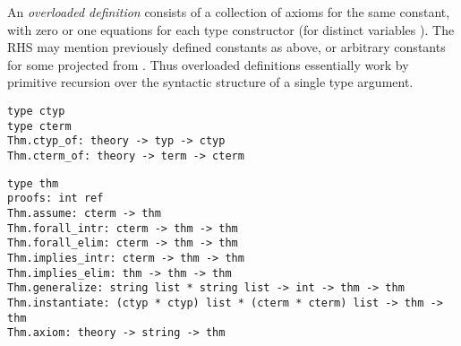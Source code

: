 \begin{isabellebody}
\begin{isamarkuptext}
  An \emph{overloaded definition} consists of a collection of axioms
  for the same constant, with zero or one equations  for each type constructor \isa{{\isasymkappa}} (for
  distinct variables \isa{\isactrlvec {\isasymalpha}}).  The RHS may mention
  previously defined constants as above, or arbitrary constants  for some  projected from \isa{\isactrlvec {\isasymalpha}}.  Thus overloaded definitions essentially work by
  primitive recursion over the syntactic structure of a single type
  argument.%
\end{isamarkuptext}%
\isamarkuptrue%
%
\isadelimmlref
%
\endisadelimmlref
%
\isatagmlref
%
\begin{isamarkuptext}%
\begin{mldecls}
  \verb|type ctyp| \\
  \verb|type cterm| \\
  \verb|Thm.ctyp_of: theory -> typ -> ctyp| \\
  \verb|Thm.cterm_of: theory -> term -> cterm| \\
  \end{mldecls}
  \begin{mldecls}
  \verb|type thm| \\
  \verb|proofs: int ref| \\
  \verb|Thm.assume: cterm -> thm| \\
  \verb|Thm.forall_intr: cterm -> thm -> thm| \\
  \verb|Thm.forall_elim: cterm -> thm -> thm| \\
  \verb|Thm.implies_intr: cterm -> thm -> thm| \\
  \verb|Thm.implies_elim: thm -> thm -> thm| \\
  \verb|Thm.generalize: string list * string list -> int -> thm -> thm| \\
  \verb|Thm.instantiate: (ctyp * ctyp) list * (cterm * cterm) list -> thm -> thm| \\
  \verb|Thm.axiom: theory -> string -> thm| \\

\end{mldecls}
\end{isamarkuptext}
\end{isabellebody}
